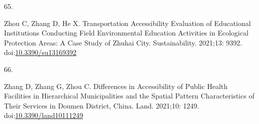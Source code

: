 \documentclass[10pt,letterpaper]{article}
\newlength{\cslhangindent}
\newlength{\csllabelwidth}
\newlength{\cslentryspacingunit} %
\newenvironment{CSLReferences}[2] %
 {%
  \setlength{\parindent}{0pt}
  \ifodd #1
  \let\oldpar\par
  \def\par{\hangindent=\cslhangindent\oldpar}
  \fi
  \setlength{\parskip}{#2\cslentryspacingunit}
 }%
 {}
\newcommand{\CSLLeftMargin}[1]{\parbox[t]{\csllabelwidth}{#1}}
\newcommand{\CSLRightInline}[1]{\parbox[t]{\linewidth - \csllabelwidth}{#1}\break}
\begin{document}
\begin{CSLReferences}{0}{0}
\leavevmode{}%
\CSLLeftMargin{65. }%
\CSLRightInline{Zhou C, Zhang D, He X. Transportation {Accessibility
Evaluation} of {Educational Institutions Conducting Field Environmental
Education Activities} in {Ecological Protection Areas}: {A Case Study}
of {Zhuhai City}. Sustainability. 2021;13: 9392.
doi:\href{https://doi.org/10.3390/su13169392}{10.3390/su13169392}}

\leavevmode{}%
\CSLLeftMargin{66. }%
\CSLRightInline{Zhang D, Zhang G, Zhou C. Differences in {Accessibility}
of {Public Health Facilities} in {Hierarchical Municipalities} and the
{Spatial Pattern Characteristics} of {Their Services} in {Doumen
District}, {China}. Land. 2021;10: 1249.
doi:\href{https://doi.org/10.3390/land10111249}{10.3390/land10111249}}

\end{CSLReferences}

\nolinenumbers
\end{document}
